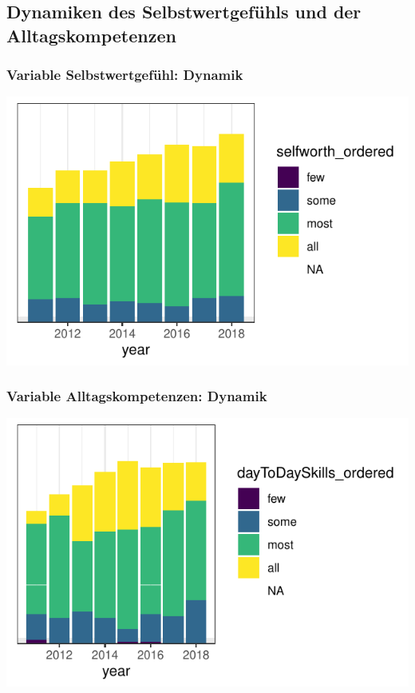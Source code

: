 \subsection{Dynamiken des Selbstwertgefühls und der Alltagskompetenzen}

\begin{frame}[fragile]
\frametitle{Variable \glqq Selbstwertgefühl\grqq: Dynamik}
\begin{knitrout}\footnotesize
{}\color{fgcolor}

{\centering \includegraphics[width=\maxwidth]{figure/beamer-SelfworthTime-1} 

}



\end{knitrout}
\end{frame}

\begin{frame}[fragile]
\frametitle{Variable \glqq Alltagskompetenzen\grqq: Dynamik}
\begin{knitrout}\footnotesize
{}\color{fgcolor}

{\centering \includegraphics[width=\maxwidth]{figure/beamer-DayToDayTime-1} 

}



\end{knitrout}
\end{frame}

